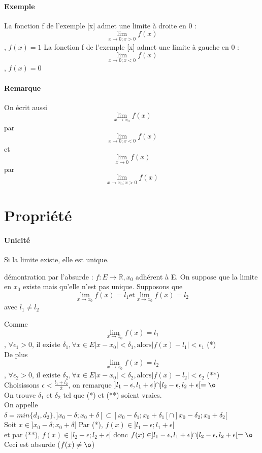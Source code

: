 \paragraph{Exemple}
La fonction f de l'exemple [x] admet une limite à droite en 0 : \[ \lim_{x \to 0 ; x > 0} f(x)\], $f(x) = 1$
La fonction f de l'exemple [x] admet une limite à gauche en 0 : \[ \lim_{x \to 0 ; x < 0} f(x)\], $f(x) = 0$

\paragraph{Remarque} On écrit aussi \[ \lim_{x \to x_0} f(x)\] par \[ \lim_{x \to 0 ; x < 0} f(x)\] et ~\\
\[ \lim_{x \to 0} f(x)\] par \[ \lim_{x \to x_0 ; x > 0} f(x)\]

\section{Propriété}
\paragraph{Unicité} Si la limite existe, elle est unique.

démontration par l'absurde : $f : E \rightarrow \mathbb{R}, x_0$ adhérent à E. On suppose que la limite en $x_0$ existe mais qu'elle n'est pas unique.
Supposons que \[\lim_{x \to x_0} f(x) = l_1 \text{et} \lim_{x \to x_0} f(x) = l_2\] avec $l_1 \neq l_2$

Comme \[ \lim_{x \to x_0} f(x) = l_1\], $\forall \epsilon_1 > 0$, il existe $\delta_1, \forall x \in E |x-x_0|< \delta_1, \text{alors} |f(x) - l_1| < \epsilon_1$ (*)
~\\
De plus\[ \lim_{x \to x_0} f(x) = l_2\], $\forall \epsilon_2 > 0$, il existe $\delta_2, \forall x \in E |x-x_0|< \delta_2, \text{alors} |f(x) - l_2| < \epsilon_2$ (**)
~\\

Choisissons $\epsilon < \frac{l_1+l_2}{2}$, on remarque $]l_1 - \epsilon, l_1 + \epsilon[ \cap ]l_2 - \epsilon, l_2 + \epsilon[ = \o$
~\\
	On trouve $\delta_1$ et $\delta_2$ tel que (*) et (**) soient vraies.
~\\
On appelle $\delta = min\{d_1, d_2\}, ]x_0-\delta; x_0+\delta[ \subset ]x_0 - \delta_1; x_0+\delta_1[ \cap ]x_0-\delta_2;x_0+\delta_2[$
~\\

Soit $x \in ]x_0-\delta; x_0+\delta[$ Par (*), $f(x) \in ]l_1-\epsilon; l_1+\epsilon[$
~\\
et par (**), $f(x) \in ]l_2-\epsilon; l_2+\epsilon[$ donc $f(x) \in ]l_1 - \epsilon, l_1 + \epsilon[ \cap ]l_2 - \epsilon, l_2 + \epsilon[ = \o $ Ceci est absurde ($f(x) \neq \o$)
~\\

